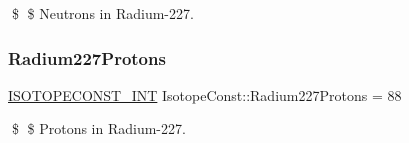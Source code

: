 \$ \$ Neutrons in Radium-\/227. \mbox{\label{group___isotope_const-_radium-_ra227_ga1dd2b2837558f7432415fa224f983299}} 
\subsubsection{\texorpdfstring{Radium227\+Protons}{Radium227Protons}}
{\footnotesize\ttfamily \mbox{\hyperlink{group___isotope_const-_macros_ga5f18360b3e99483a35c32d789e62621c}{I\+S\+O\+T\+O\+P\+E\+C\+O\+N\+S\+T\+\_\+\+I\+NT}} Isotope\+Const\+::\+Radium227\+Protons = 88}

\$ \$ Protons in Radium-\/227. 